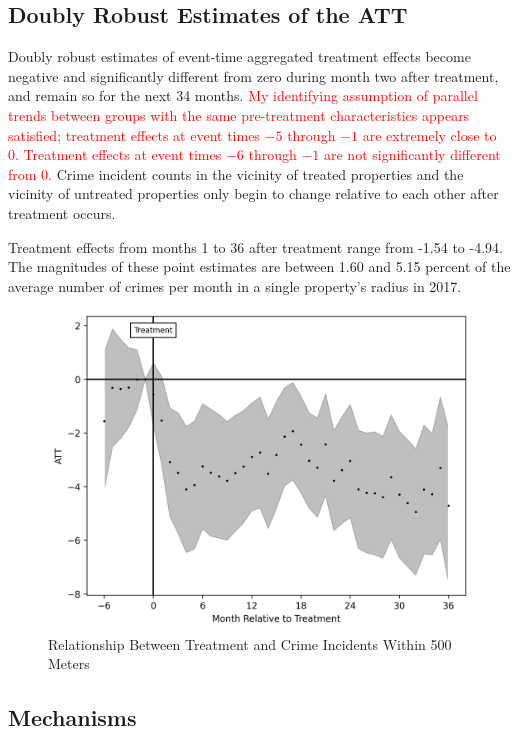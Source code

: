 \documentclass[12pt]{article}
\begin{document}
    \subsection{Doubly Robust Estimates of the ATT}
    Doubly robust estimates of event-time aggregated treatment effects become negative and significantly different from zero during month two after treatment, and remain so for the next 34 months. \textcolor{red}{My identifying assumption of parallel trends between groups with the same pre-treatment characteristics appears satisfied; treatment effects at event times $-5$ through $-1$ are extremely close to 0. Treatment effects at event times $-6$ through $-1$ are not significantly different from 0.} Crime incident counts in the vicinity of treated properties and the vicinity of untreated properties only begin to change relative to each other after treatment occurs.

    Treatment effects from months 1 to 36 after treatment range from -1.54 to -4.94. The magnitudes of these point estimates are between 1.60 and 5.15 percent of the average number of crimes per month in a single property's radius in 2017.
    
    \begin{figure}[H]
        \centering
        \includegraphics{output/group_0_crimes_500m/figures/att_gt_dr_event_study_long_horizon.png}
        \caption{Relationship Between Treatment and Crime Incidents Within 500 Meters}
        \label{fig:my_label}
    \end{figure}


    
    \subsection{Mechanisms}
\end{document}
